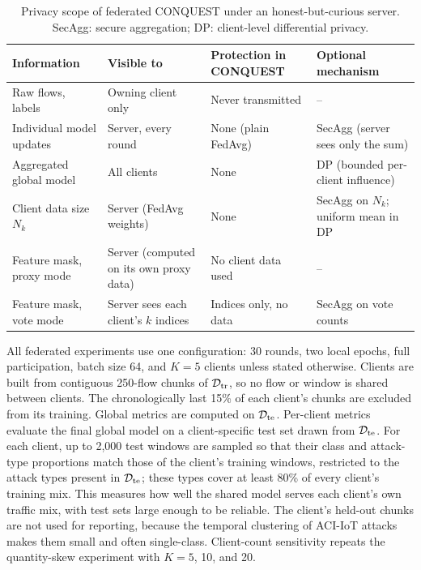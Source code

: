 \documentclass[conference]{IEEEtran}
\begin{document}
\begin{table}[!t]
\centering
\scriptsize
\caption{Privacy scope of federated CONQUEST
under an honest-but-curious server. SecAgg: secure aggregation; DP:
client-level differential privacy.}
\label{tab:privacy_scope}
\setlength{\tabcolsep}{3pt}
\renewcommand{\arraystretch}{1.08}
\begin{tabular}{p{1.7cm} p{1.6cm} p{1.75cm} p{1.75cm}}
\hline\toprule
\textbf{Information} & \textbf{Visible to} & \textbf{Protection in CONQUEST} & \textbf{Optional mechanism} \\
\hline\toprule
Raw flows, labels & Owning client only & Never transmitted & -- \\
Individual model updates & Server, every round & None (plain FedAvg) & SecAgg (server sees only the sum) \\
Aggregated global model & All clients & None & DP (bounded per-client influence) \\
Client data size $N_k$ & Server (FedAvg weights) & None & SecAgg on $N_k$; uniform mean in DP \\
Feature mask, proxy mode & Server (computed on its own proxy data) & No client data used & -- \\
Feature mask, vote mode & Server sees each client's $k$ indices & Indices only, no data & SecAgg on vote counts \\
\hline\toprule
\end{tabular}
\end{table}

All federated experiments use one
configuration: 30 rounds, two local epochs, full participation, batch
size 64, and $K=5$ clients unless stated otherwise. Clients are built
from contiguous 250-flow chunks of $\mathcal{D}_{\rm tr}$, so no flow
or window is shared between clients. The chronologically last 15\% of
each client's chunks are excluded from its training. Global metrics
are computed on $\mathcal{D}_{\rm te}$.
Per-client metrics
evaluate the final global model on a client-specific test set drawn
from $\mathcal{D}_{\rm te}$. For each client, up to 2{,}000 test
windows are sampled so that their class and attack-type proportions
match those of the client's training windows, restricted to the
attack types present in $\mathcal{D}_{\rm te}$; these types cover at
least 80\% of every client's training mix. This measures how well the
shared model serves each client's own traffic mix, with test sets
large enough to be reliable. The client's held-out chunks are not
used for reporting, because the temporal clustering of ACI-IoT
attacks makes them small and often single-class. Client-count
sensitivity repeats the quantity-skew experiment with $K=5$, 10, and
20.
\end{document}

